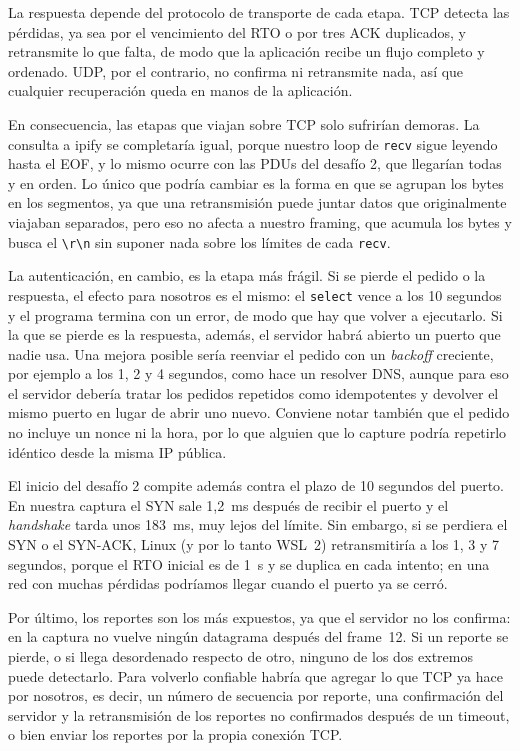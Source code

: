 \documentclass[11pt,a4paper]{article}
\newcommand{\code}[1]{\texttt{#1}}
\newcommand{\crlf}{\code{\textbackslash r\textbackslash n}}
\begin{document}
La respuesta depende del protocolo de transporte de cada etapa. TCP detecta las pérdidas, ya sea por el vencimiento del RTO o por tres ACK duplicados, y retransmite lo que falta, de modo que la aplicación recibe un flujo completo y ordenado. UDP, por el contrario, no confirma ni retransmite nada, así que cualquier recuperación queda en manos de la aplicación.

En consecuencia, las etapas que viajan sobre TCP solo sufrirían demoras. La consulta a ipify se completaría igual, porque nuestro loop de \code{recv} sigue leyendo hasta el EOF, y lo mismo ocurre con las PDUs del desafío 2, que llegarían todas y en orden. Lo único que podría cambiar es la forma en que se agrupan los bytes en los segmentos, ya que una retransmisión puede juntar datos que originalmente viajaban separados, pero eso no afecta a nuestro framing, que acumula los bytes y busca el \crlf{} sin suponer nada sobre los límites de cada \code{recv}.

La autenticación, en cambio, es la etapa más frágil. Si se pierde el pedido o la respuesta, el efecto para nosotros es el mismo: el \code{select} vence a los 10 segundos y el programa termina con un error, de modo que hay que volver a ejecutarlo. Si la que se pierde es la respuesta, además, el servidor habrá abierto un puerto que nadie usa. Una mejora posible sería reenviar el pedido con un \emph{backoff} creciente, por ejemplo a los 1, 2 y 4 segundos, como hace un resolver DNS, aunque para eso el servidor debería tratar los pedidos repetidos como idempotentes y devolver el mismo puerto en lugar de abrir uno nuevo. Conviene notar también que el pedido no incluye un nonce ni la hora, por lo que alguien que lo capture podría repetirlo idéntico desde la misma IP pública.

El inicio del desafío 2 compite además contra el plazo de 10 segundos del puerto. En nuestra captura el SYN sale 1,2~ms después de recibir el puerto y el \emph{handshake} tarda unos 183~ms, muy lejos del límite. Sin embargo, si se perdiera el SYN o el SYN-ACK, Linux (y por lo tanto WSL~2) retransmitiría a los 1, 3 y 7 segundos, porque el RTO inicial es de 1~s y se duplica en cada intento; en una red con muchas pérdidas podríamos llegar cuando el puerto ya se cerró.

Por último, los reportes son los más expuestos, ya que el servidor no los confirma: en la captura no vuelve ningún datagrama después del frame~12. Si un reporte se pierde, o si llega desordenado respecto de otro, ninguno de los dos extremos puede detectarlo. Para volverlo confiable habría que agregar lo que TCP ya hace por nosotros, es decir, un número de secuencia por reporte, una confirmación del servidor y la retransmisión de los reportes no confirmados después de un timeout, o bien enviar los reportes por la propia conexión TCP.
\end{document}

